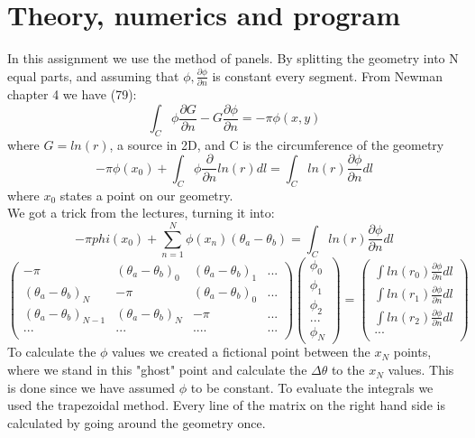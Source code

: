 \documentclass[a4paper,norsk]{article}
\begin{document}
\section*{Theory, numerics and program}
In this assignment we use the method of panels. By splitting the geometry into N equal parts, and assuming that $\phi , \frac{\partial \phi }{\partial n}$ is constant every segment.
\newline
From Newman chapter 4 we have (79):
\[   \int_C \phi \frac{\partial G }{\partial n} - G\frac{\partial \phi }{\partial n} = -\pi \phi(x,y) \]
where $G = ln (r)$, a source in 2D, and C is the circumference of the geometry
$$ -\pi \phi(x_0) + \int_C \phi \frac{\partial }{\partial n} ln(r) dl = \int_C ln(r) \frac{\partial \phi}{\partial n} dl       $$
where $x_0$ states a point on our geometry.\\
\newline
We got a trick from the lectures, turning it into:
\[ -\pi phi(x_0) + \sum_{n=1}^N \phi(x_n) (\theta_a - \theta_b)  = \int_C ln(r)\frac{\partial \phi }{\partial n} dl    \]
$$
\begin{pmatrix}
  -\pi & (\theta_a - \theta_b)_0  & (\theta_a - \theta_b)_1 & ...\\
  (\theta_a - \theta_b)_N  & -\pi & (\theta_a - \theta_b)_0  & ...\\
  (\theta_a - \theta_b)_{N-1}  & (\theta_a - \theta_b)_N  & -\pi & ...\\
  ... & ... & ....& ...  \\
 \end{pmatrix}
 \begin{pmatrix}
\phi_0  \\
\phi_1 \\
\phi_2 \\ 
  ...  \\
  \phi_N
 \end{pmatrix}
 =
 \begin{pmatrix}
\int ln(r_0)\frac{\partial \phi }{\partial n} dl   \\
\int ln(r_1)\frac{\partial \phi }{\partial n} dl  \\
\int ln(r_2)\frac{\partial \phi }{\partial n} dl  \\ 
  ...  \\
  \end{pmatrix}
  $$
To calculate the $\phi$ values we created a fictional point between the $x_N$ points, where we stand in this "ghost" point and calculate the $\Delta \theta$ to the $x_N$ values. This is done since we have assumed $\phi$ to be constant.
To evaluate the integrals we used the trapezoidal method.
Every line of the matrix on the right hand side is calculated by going around the geometry once.
\end{document}
